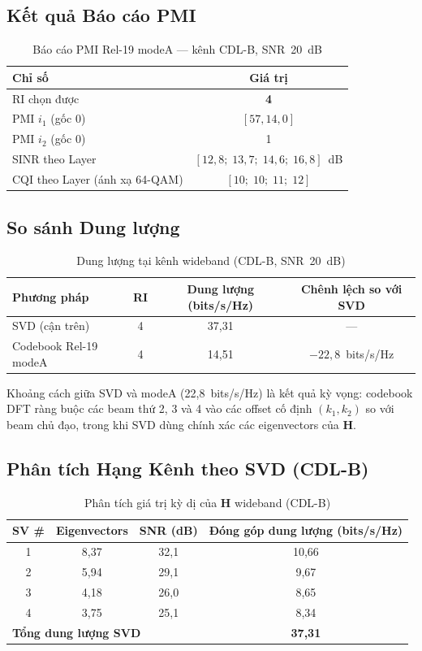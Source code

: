 \documentclass[11pt,a4paper]{article}
\begin{document}
\subsection{Kết quả Báo cáo PMI}

\begin{table}[H]
\centering
\caption{Báo cáo PMI Rel-19 modeA --- kênh CDL-B, SNR~20~dB}
\begin{tabular}{lc}
\toprule
Chỉ số & Giá trị \\
\midrule
RI chọn được & \textbf{4} \\
PMI $i_1$ (gốc 0) & $[57, 14, 0]$ \\
PMI $i_2$ (gốc 0) & 1 \\
SINR theo Layer & $[12{,}8;\;13{,}7;\;14{,}6;\;16{,}8]$~dB \\
CQI theo Layer (ánh xạ 64-QAM) & $[10;\;10;\;11;\;12]$ \\
\bottomrule
\end{tabular}
\end{table}

\subsection{So sánh Dung lượng}

\begin{table}[H]
\centering
\caption{Dung lượng tại kênh wideband (CDL-B, SNR~20~dB)}
\begin{tabular}{lccc}
\toprule
Phương pháp & RI & Dung lượng (bits/s/Hz) & Chênh lệch so với SVD \\
\midrule
SVD (cận trên) & 4 & 37,31 & --- \\
Codebook Rel-19 modeA & 4 & 14,51 & $-22{,}8$~bits/s/Hz \\
\bottomrule
\end{tabular}
\end{table}

Khoảng cách giữa SVD và modeA (22,8~bits/s/Hz) là kết quả kỳ vọng:
codebook DFT ràng buộc các beam thứ 2, 3 và 4 vào các offset cố định $(k_1,k_2)$
so với beam chủ đạo, trong khi SVD dùng chính xác các eigenvectors
của $\mathbf{H}$.

\subsection{Phân tích Hạng Kênh theo SVD (CDL-B)}

\begin{table}[H]
\centering
\caption{Phân tích giá trị kỳ dị của $\mathbf{H}$ wideband (CDL-B)}
\begin{tabular}{cccc}
\toprule
SV \# & Eigenvectors & SNR (dB) & Đóng góp dung lượng (bits/s/Hz) \\
\midrule
1 & 8,37 & 32,1 & 10,66 \\
2 & 5,94 & 29,1 & 9,67 \\
3 & 4,18 & 26,0 & 8,65 \\
4 & 3,75 & 25,1 & 8,34 \\
\midrule
\multicolumn{3}{l}{\textbf{Tổng dung lượng SVD}} & \textbf{37,31} \\
\bottomrule
\end{tabular}
\end{table}
\end{document}
